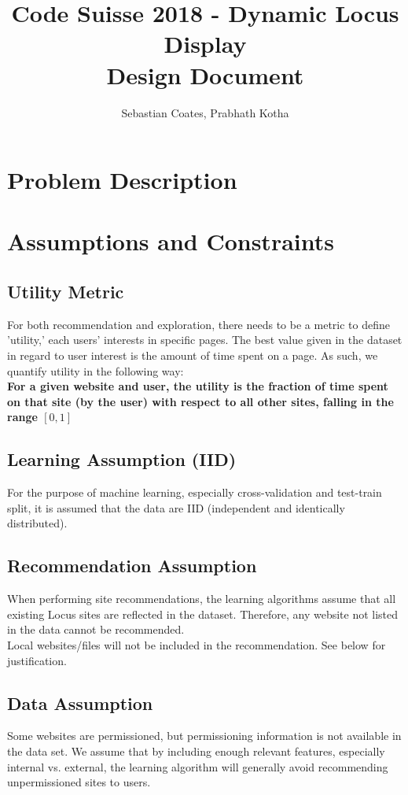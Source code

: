 \documentclass{article}
\title{\textbf{Code Suisse 2018 - Dynamic Locus Display \\ Design Document}}
\author{Sebastian Coates, Prabhath Kotha}
\begin{document}
 
\maketitle{} 
\setlength{\parindent}{0pt}


\clearpage
\section*{Problem Description}



\clearpage
\section*{Assumptions and Constraints}
\subsection*{Utility Metric}
For both recommendation and exploration, there needs to be a metric to define 
'utility,' each users' interests in specific pages. The best value given in the
dataset in regard to user interest is the amount of time spent on a page. As such,
we quantify utility in the following way: \\ 
\textbf{For a given website and user, the utility is the fraction of time spent 
on that site (by the user) with respect to all other sites, falling in the range $[0,1]$} \\ 

\subsection*{Learning Assumption (IID)} 
For the purpose of machine learning, especially cross-validation and test-train split,
it is assumed that the data are IID (independent and identically distributed). 

\subsection*{Recommendation Assumption} 
When performing site recommendations, the learning algorithms assume that all
existing Locus sites are reflected in the dataset. Therefore, any website not 
listed in the data cannot be recommended. \\

Local websites/files will not be included in the recommendation. See below for 
justification. \\

\subsection*{Data Assumption} 
Some websites are permissioned, but permissioning information is not available
in the data set. We assume that by including enough relevant features, especially
internal vs. external, the learning algorithm will generally avoid recommending
unpermissioned sites to users. \\
\end{document}
